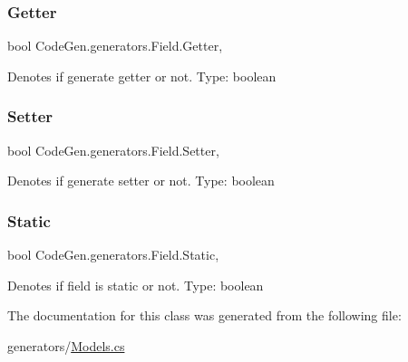 \subsubsection{\texorpdfstring{Getter}{Getter}}
{\footnotesize\ttfamily bool Code\+Gen.\+generators.\+Field.\+Getter\hspace{0.3cm}{\ttfamily [get]}, {\ttfamily [set]}}



Denotes if generate getter or not. Type\+: boolean 

\mbox{\label{classCodeGen_1_1generators_1_1Field_ad57a32f584421475ceb3c929e56b20f9}} 
\subsubsection{\texorpdfstring{Setter}{Setter}}
{\footnotesize\ttfamily bool Code\+Gen.\+generators.\+Field.\+Setter\hspace{0.3cm}{\ttfamily [get]}, {\ttfamily [set]}}



Denotes if generate setter or not. Type\+: boolean 

\mbox{\label{classCodeGen_1_1generators_1_1Field_a09f180833f4cf101aa0b4183407d7a80}} 
\subsubsection{\texorpdfstring{Static}{Static}}
{\footnotesize\ttfamily bool Code\+Gen.\+generators.\+Field.\+Static\hspace{0.3cm}{\ttfamily [get]}, {\ttfamily [set]}}



Denotes if field is static or not. Type\+: boolean 



The documentation for this class was generated from the following file\+:\begin{DoxyCompactItemize}
\item 
generators/\mbox{\hyperlink{Models_8cs}{Models.\+cs}}\end{DoxyCompactItemize}
